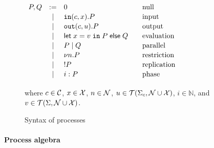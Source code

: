  \begin{figure}[t]
   \null\hfill$
  \begin{array}{rclcl}
    P,Q &:=&  0 & & \mbox{null}\\[0.5mm]
    &\mid & \mathtt{in}(c, x).P && \mbox{input}\\[0.5mm]
    &\mid&\mathtt{out}(c, u).P &&\mbox{output} \\[0.5mm]
    &\mid& \mathsf{let} \; x = v \;\mathtt{in} \; P \; \mathsf{else} \; Q&&
    \mbox{evaluation}\\[0.5mm]
    &\; \mid \; & P \mid Q&&\mbox{parallel}\\[0.5mm]
    &\mid& \nu n. P && \mbox{restriction} \\[0.5mm]
    &\mid&  !P && \mbox{replication} \\[0.5mm]
    &\mid&  i: P && \mbox{phase} \\[0.5mm]
  \end{array} 
$\hfill\null\\
  \begin{small}
    where $c \in \mathcal{C}$, $x \in \mathcal{X}$, $n \in \mathcal{N}$,
    $u \in \mathcal{T}(\Sigma_c, \mathcal{N} \cup \mathcal{X})$, $i\in\mathbb{N}$, and
    $v\in\mathcal{T}(\Sigma, \mathcal{N}\cup\mathcal{X})$.
  \end{small}
\vspace{-5pt}
  \caption{Syntax of processes}
 \label{fig:syntax}
 \end{figure}

\paragraph{\textbf{Process algebra}}

